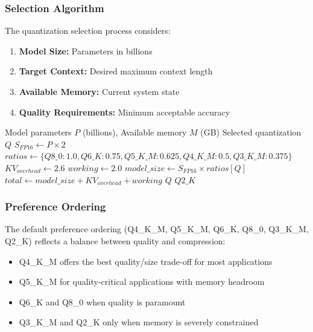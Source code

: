 \subsubsection{Selection Algorithm}

The quantization selection process considers:

\begin{enumerate}
    \item \textbf{Model Size:} Parameters in billions
    \item \textbf{Target Context:} Desired maximum context length
    \item \textbf{Available Memory:} Current system state
    \item \textbf{Quality Requirements:} Minimum acceptable accuracy
\end{enumerate}

\begin{algorithm}[H]
\caption{Quantization Selection Algorithm}
\label{alg:quant_selection}
\begin{algorithmic}[1]
\Require Model parameters $P$ (billions), Available memory $M$ (GB)
\Ensure Selected quantization $Q$
\State $S_{FP16} \gets P \times 2$ 
\State $ratios \gets \{Q8\_0: 1.0, Q6\_K: 0.75, Q5\_K\_M: 0.625, Q4\_K\_M: 0.5, Q3\_K\_M: 0.375\}$
\State $KV_{overhead} \gets 2.6$ 
\State $working \gets 2.0$
    \State $model\_size \gets S_{FP16} \times ratios[Q]$
    \State $total \gets model\_size + KV_{overhead} + working$
        \State \Return $Q$
    \EndIf
\EndFor
\State \Return $Q2\_K$ 
\end{algorithmic}
\end{algorithm}

\subsubsection{Preference Ordering}

The default preference ordering (Q4\_K\_M, Q5\_K\_M, Q6\_K, Q8\_0, Q3\_K\_M, Q2\_K) reflects a balance between quality and compression:

\begin{itemize}
    \item Q4\_K\_M offers the best quality/size trade-off for most applications
    \item Q5\_K\_M for quality-critical applications with memory headroom
    \item Q6\_K and Q8\_0 when quality is paramount
    \item Q3\_K\_M and Q2\_K only when memory is severely constrained
\end{itemize}

